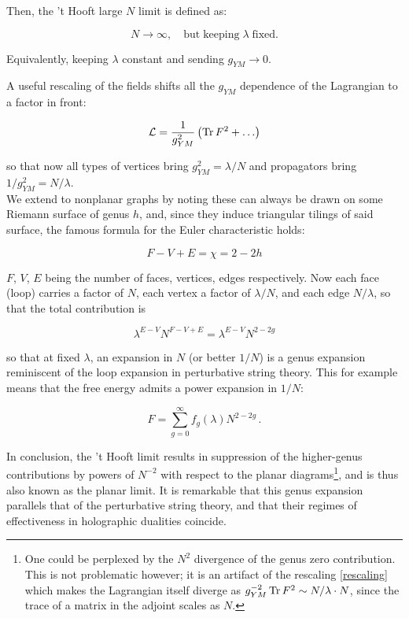 Then, the 't Hooft large $N$ limit is defined as:

\begin{equation}
N \rightarrow \infty, \quad \mathrm{but \; keeping } \; \lambda \; \mathrm{fixed.}
\end{equation}

Equivalently, keeping $\lambda$ constant and sending $g_{YM} \rightarrow 0$.

A useful rescaling of the fields shifts all the $g_{YM}$ dependence of the Lagrangian to a factor in front:

\begin{equation} \label{rescaling} \mathcal{L} = \frac{1}{g_{YM}^2} \left( \operatorname{Tr} F^2 + \ldots \right) \end{equation}

so that now all types of vertices bring $g_{YM}^2 = \lambda/N$ and propagators bring $1/g_{YM}^2 = N/\lambda$.\\

We extend to nonplanar graphs by noting these can always be drawn on some Riemann surface of genus $h$, and, since they induce triangular tilings of said surface, the famous formula for the Euler characteristic holds:

\begin{equation}
F - V + E = \chi = 2 - 2h 
\end{equation}

$F$, $V$, $E$ being the number of faces, vertices, edges respectively. Now each face (loop) carries a factor of $N$, each vertex a factor of $\lambda/N$, and each edge $N/\lambda$, so that the total contribution is

\begin{equation}
\lambda^{E-V} N^{F-V+E} = \lambda^{E-V} N^{2-2g} 
\end{equation}

so that at fixed $\lambda$, an expansion in $N$ (or better $1/N$) is a genus expansion reminiscent of the loop expansion in perturbative string theory. This for example means that the free energy admits a power expansion in $1/N$:

\begin{equation}
F = \sum_{g=0}^\infty f_g(\lambda) N^{2-2g}\,.
\end{equation}

In conclusion, the 't Hooft limit results in suppression of the higher-genus contributions by powers of $N^{-2}$ with respect to the planar diagrams\footnote{One could be perplexed by the $N^2$ divergence of the genus zero contribution. This is not problematic however; it is an artifact of the rescaling \ref{rescaling} which makes the Lagrangian itself diverge as $g_{YM}^{-2} \operatorname{Tr} F^2 \sim N/\lambda \cdot N$, since the trace of a matrix in the adjoint scales as $N$.}, and is thus also known as the planar limit. It is remarkable that this genus expansion parallels that of the perturbative string theory, and that their regimes of effectiveness in holographic dualities coincide.

